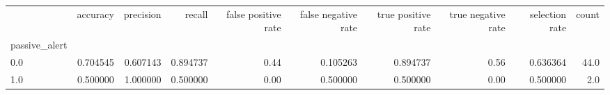 \begin{tabular}{lrrrrrrrrr}
\toprule
{} &  accuracy &  precision &    recall &  false positive rate &  false negative rate &  true positive rate &  true negative rate &  selection rate &  count \\
passive\_alert &           &            &           &                      &                      &                     &                     &                 &        \\
\midrule
0.0           &  0.704545 &   0.607143 &  0.894737 &                 0.44 &             0.105263 &            0.894737 &                0.56 &        0.636364 &   44.0 \\
1.0           &  0.500000 &   1.000000 &  0.500000 &                 0.00 &             0.500000 &            0.500000 &                0.00 &        0.500000 &    2.0 \\
\bottomrule
\end{tabular}
